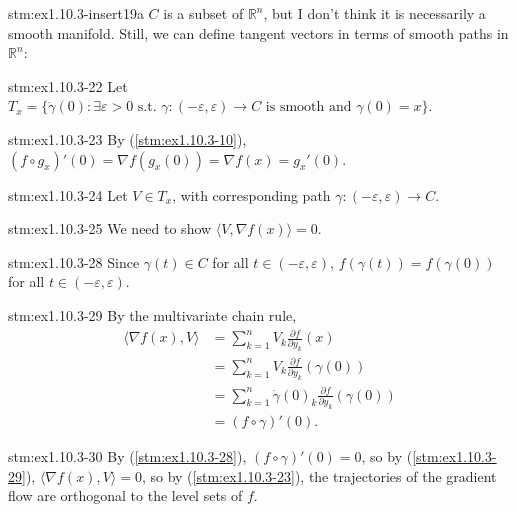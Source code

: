 \begin{explanation}{stm:ex1.10.3-insert19a}
$C$ is a subset of $\mathbb{R}^n$, but I don't think it is necessarily a smooth manifold. Still, we can define tangent vectors in terms of smooth paths in $\mathbb{R}^n$:
\end{explanation}

\begin{statement}{stm:ex1.10.3-22}
Let $T_x = \{ \dot{\gamma}(0) : \exists \varepsilon > 0 \text{ s.t. } \gamma : (-\varepsilon, \varepsilon) \to C \text{ is smooth and } \gamma(0) = x \}$.
\end{statement}

\begin{statement}{stm:ex1.10.3-23}
By (\ref{stm:ex1.10.3-10}), $(f \circ g_x)'(0) = \nabla f(g_x(0)) = \nabla f(x) = g_x'(0)$.
\end{statement}

\begin{statement}{stm:ex1.10.3-24}
Let $V \in T_x$, with corresponding path $\gamma : (-\varepsilon, \varepsilon) \to C$.
\end{statement}

\begin{explanation}{stm:ex1.10.3-25}
We need to show $\langle V, \nabla f(x) \rangle = 0$.
\end{explanation}

\begin{statement}{stm:ex1.10.3-28}
Since $\gamma(t) \in C$ for all $t \in (-\varepsilon, \varepsilon)$, $f(\gamma(t)) = f(\gamma(0))$ for all $t \in (-\varepsilon, \varepsilon)$. 
\end{statement}

\begin{statement}{stm:ex1.10.3-29}
By the multivariate chain rule,
\begin{align*}
\langle \nabla f(x), V \rangle 
&= \sum_{k=1}^n V_k \frac{\partial f}{\partial y_k}(x) \\
&= \sum_{k=1}^n V_k \frac{\partial f}{\partial y_k}(\gamma(0)) \\
&= \sum_{k=1}^n \dot{\gamma}(0)_k \frac{\partial f}{\partial y_k}(\gamma(0)) \\
&= (f \circ \gamma)'(0).
\end{align*}
\end{statement}

\begin{statement}{stm:ex1.10.3-30}
By (\ref{stm:ex1.10.3-28}), $(f \circ \gamma)'(0) = 0$, so by (\ref{stm:ex1.10.3-29}), $\langle \nabla f(x), V \rangle = 0$, so by (\ref{stm:ex1.10.3-23}), the trajectories of the gradient flow are orthogonal to the level sets of $f$.
\end{statement}
